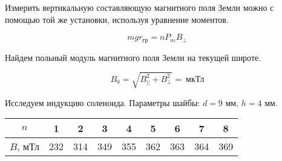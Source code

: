     Измерить вертикальную составляющую магнитного поля Земли можно с помощью той же установки, используя уравнение моментов.

    \begin{equation*}
        m g r_{\text{гр}} = n P_m B_{\perp}
    \end{equation*}

    \begin{center}
    \end{center}

    Найдем польный модуль магнитного поля Земли на текущей широте.

    \begin{equation*}
        B_0 = \sqrt{B_{||}^2 + B_{\perp}^2} = ~ \text{мкТл}
    \end{equation*}

    Исследуем индукцию соленоида. Параметры шайбы: $d = 9$ мм, $h = 4$ мм.

    \begin{table}[h!]
        \begin{center}
            \begin{tabular}{|c|c|c|c|c|c|c|c|c|}
                \hline
                $n$      & 1   & 2   & 3   & 4   & 5   & 6   & 7   & 8   \\ \hline
                $B$, мТл & 232 & 314 & 349 & 355 & 362 & 363 & 364 & 369 \\ \hline
            \end{tabular}
        \end{center}
    \end{table}
